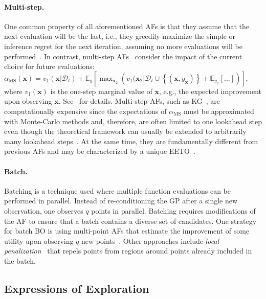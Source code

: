 \documentclass[accepted]{uai2025}
\begin{document}
\paragraph{Multi-step.}
One common property of all aforementioned \acp{AF} is that they assume that the next evaluation will be the last, i.e., they greedily maximize the simple or inference regret for the next iteration, assuming no more evaluations will be performed~\citep{wang2017max}.
In contrast, multi-step \acp{AF}~\citep{ginsbourger2010towards,wu2019practical,jiang2020efficient} consider the impact of the current choice for future evaluations: $\alpha_{\text{MS}}(\bm{x}) = v_1(\bm{x}|\mathcal{D}_t)+\mathbb{E}_y\left[\max_{\bm{x}_2}\left(v_1(\bm{x}_2\vert\mathcal{D}_t\cup\left\{(\bm{x},y_{\bm x})\right\}+\mathbb{E}_{y_2}\left[\ldots\right]\right)\right]$,
where $v_1(\bm{x})$ is the one-step marginal value of $\bm{x}$, e.g., the expected improvement upon observing $\bm{x}$.
See~\cite{jiang2020efficient} for details.
Multi-step \acp{AF}, such as \ac{KG}~\citep{frazier2009knowledge}, are computationally expensive since the expectations of $\alpha_{\text{MS}}$ must be approximated with Monte-Carlo methods and, therefore, are often limited to one lookahead step even though the theoretical framework can usually be extended to arbitrarily many lookahead steps~\citep{jiang2020efficient}.
At the same time, they are fundamentally different from previous \acp{AF} and may be characterized by a unique \ac{EETO}~\citep{wu2019practical}.

\paragraph{Batch.}

Batching is a technique used where multiple function evaluations can be performed in parallel.
Instead of re-conditioning the \ac{GP} after a single new observation, one observes $q$ points in parallel.
Batching requires modifications of the \ac{AF} to ensure that a batch contains a diverse set of candidates.
One strategy for batch \ac{BO} is using multi-point \acp{AF} that estimate the improvement of some utility upon observing $q$ new points~\citep{wang2020parallel}.
Other approaches include \emph{local penalization}~\citep{gonzalez2016batch} that repels points from regions around points already included in the batch.

\subsection{Expressions of Exploration}
\end{document}
